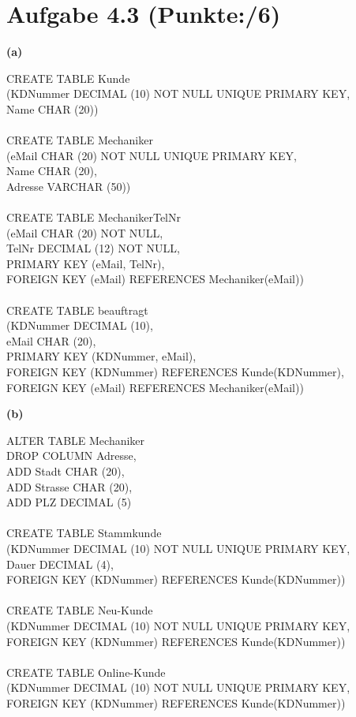 \documentclass[11pt, a4paper]{article}
\newcommand{\blattnummer}{4}
\newcommand{\ppp}{6}
\newcommand{\aufgabe}[2] {\section*{Aufgabe \blattnummer.#1 (Punkte:\qquad/#2)}}
\newcommand{\aufgabenteil}[1] {\textbf{(#1)}}
\begin{document}
\aufgabe{3}{\ppp}
\aufgabenteil{a}
\begin{adjustwidth}{20pt}{20pt}
\begin{tt}
CREATE TABLE Kunde\\
(KDNummer DECIMAL (10) NOT NULL UNIQUE PRIMARY KEY,\\
Name CHAR (20))
\\ \ \\
CREATE TABLE Mechaniker\\
(eMail CHAR (20) NOT NULL UNIQUE PRIMARY KEY,\\
Name CHAR (20),\\
Adresse VARCHAR (50))
\\ \ \\
CREATE TABLE MechanikerTelNr\\
(eMail CHAR (20) NOT NULL,\\
TelNr DECIMAL (12) NOT NULL,\\
PRIMARY KEY (eMail, TelNr),\\
FOREIGN KEY (eMail) REFERENCES Mechaniker(eMail))
\\ \ \\
CREATE TABLE beauftragt\\
(KDNummer DECIMAL (10),\\
eMail CHAR (20),\\
PRIMARY KEY (KDNummer, eMail),\\
FOREIGN KEY (KDNummer) REFERENCES Kunde(KDNummer),\\
FOREIGN KEY (eMail) REFERENCES Mechaniker(eMail))
\end{tt}
\end{adjustwidth}
\aufgabenteil{b}
\begin{adjustwidth}{20pt}{20pt}
\begin{tt}
ALTER TABLE Mechaniker\\
DROP COLUMN Adresse,\\
ADD Stadt CHAR (20),\\
ADD Strasse CHAR (20),\\
ADD PLZ DECIMAL (5)
\\ \ \\
CREATE TABLE Stammkunde\\
(KDNummer DECIMAL (10) NOT NULL UNIQUE PRIMARY KEY,\\
Dauer DECIMAL (4),\\
FOREIGN KEY (KDNummer) REFERENCES Kunde(KDNummer))
\\ \ \\
CREATE TABLE Neu-Kunde\\
(KDNummer DECIMAL (10) NOT NULL UNIQUE PRIMARY KEY,\\
FOREIGN KEY (KDNummer) REFERENCES Kunde(KDNummer))
\\ \ \\
CREATE TABLE Online-Kunde\\
(KDNummer DECIMAL (10) NOT NULL UNIQUE PRIMARY KEY,\\
FOREIGN KEY (KDNummer) REFERENCES Kunde(KDNummer))
\end{tt}
\end{adjustwidth}
\end{document}

